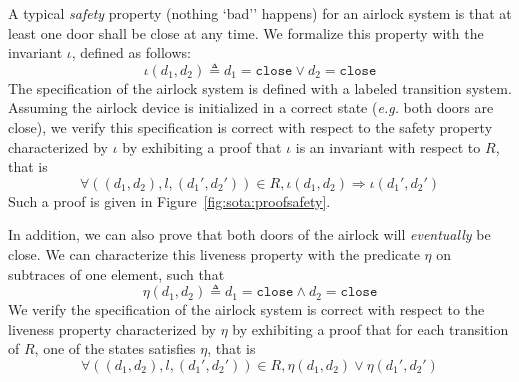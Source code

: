 \begin{example}
  A typical \emph{safety} property (nothing `bad'' happens) for an airlock
  system is that at least one door shall be close at any time.
  We formalize this property with the invariant \( \iota \), defined as follows:
  \[
    \iota( d_1, d_2) \triangleq d_1 = \mathtt{close} \vee d_2 = \mathtt{close}
  \]
  The specification of the airlock system is defined with a labeled transition
  system.
  Assuming the airlock device is initialized in a correct state (\emph{e.g.}
  both doors are close), we verify this specification is correct with respect to
  the safety property characterized by \( \iota \) by exhibiting a proof that
  \( \iota \) is an invariant with respect to \( R \), that is
  \[
    \forall ((d_1, d_2), l, (d_1', d_2')) \in R, \iota(d_1, d_2) \Rightarrow
    \iota(d_1', d_2')
  \]
  Such a proof is given in Figure~\ref{fig:sota:proofsafety}.

  In addition, we can also prove that both doors of the airlock will
  \emph{eventually} be close.
  We can characterize this liveness property with the predicate \( \eta \) on
  subtraces of one element, such that
  \[
    \eta(d_1, d_2) \triangleq d_1 = \mathtt{close} \wedge d_2 = \mathtt{close}
  \]
  We verify the specification of the airlock system is correct with respect to
  the liveness property characterized by \( \eta \) by exhibiting a proof that
  for each transition of \( R \), one of the states satisfies \( \eta \), that is
  \[
    \forall ((d_1, d_2), l, (d_1', d_2')) \in R, \eta(d_1, d_2) \vee \eta(d_1',
    d_2')
  \]

\end{example}

